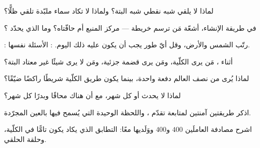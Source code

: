 \begin{exercise}[$\star$]\label{exo:g7:shadows-eclipses:2}
لماذا لا يلقي  شبه نقطي شبه  البتة؟ ولماذا لا تكاد
سماء ملبّدة تلقي ظلًّا؟
\end{exercise}

\begin{exercise}[$\star$]\label{exo:g7:shadows-eclipses:3}
في طريقة الإنشاء، أشعّة مَن ترسم خريطة  --- مركز المنبع أم
حافّتاه؟ وما الذي يحدّد ؟
\end{exercise}

\begin{exercise}[$\star$]\label{exo:g7:shadows-eclipses:4}
: رتّب الشمس  والأرض، وقل أيّ طور يجب أن يكون
عليه  ذلك اليوم. : الأسئلة نفسها.
\end{exercise}

\begin{exercise}[$\star$]\label{exo:g7:shadows-eclipses:5}
أثناء ، مَن يرى الكلّية، ومَن يرى قضمة جزئية، ومَن لا
يرى شيئًا غير معتاد البتة؟
\end{exercise}

\begin{exercise}[$\star$]\label{exo:g7:shadows-eclipses:6}
لماذا يُرى  من نصف العالم دفعة واحدة، بينما يكون
طريق الكلّية شريطًا راكضًا ضيّقًا؟
\end{exercise}

\begin{exercise}[$\star$]\label{exo:g7:shadows-eclipses:7}
لماذا لا يحدث  أو  كل شهر، مع أن هناك محاقًا وبدرًا كل
شهر؟
\end{exercise}

\begin{exercise}[$\star$]\label{exo:g7:shadows-eclipses:8}
اذكر طريقتين آمنتين لمتابعة تقدّم ، واللحظة الوحيدة
التي يُسمح فيها بالعين المجرّدة.
\end{exercise}

\begin{exercise}[$\star\star$]\label{exo:g7:shadows-eclipses:9}
اشرح مصادفة العاملَين $400$ و$400$ ووَلَديها معًا: التطابق الذي
يكاد يكون تامًّا في الكلّية، وحلقة  الحلقي.
\end{exercise}

